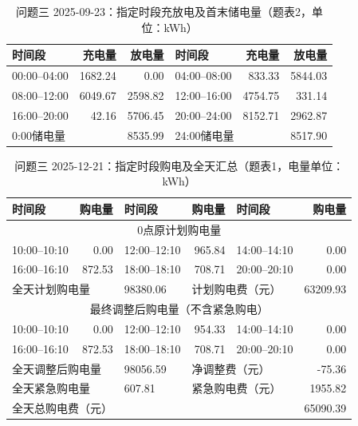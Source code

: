 \begin{table}[H]
\centering\footnotesize
\setlength{\tabcolsep}{4pt}
\caption{问题三 2025-09-23：指定时段充放电及首末储电量（题表2，单位：kWh）}
\label{tab:required-q3-2025-09-23-storage}
\begin{tabular}{@{}lrrlrr@{}}
\toprule
时间段 & 充电量 & 放电量 & 时间段 & 充电量 & 放电量 \\
\midrule
00:00--04:00 & 1682.24 & 0.00 & 04:00--08:00 & 833.33 & 5844.03 \\
08:00--12:00 & 6049.67 & 2598.82 & 12:00--16:00 & 4754.75 & 331.14 \\
16:00--20:00 & 42.16 & 5706.45 & 20:00--24:00 & 8152.71 & 2962.87 \\
\multicolumn{2}{l}{0:00储电量} & 8535.99 & \multicolumn{2}{l}{24:00储电量} & 8517.90 \\
\bottomrule
\end{tabular}
\end{table}

\FloatBarrier
\begin{table}[H]
\centering\footnotesize
\setlength{\tabcolsep}{4pt}
\caption{问题三 2025-12-21：指定时段购电及全天汇总（题表1，电量单位：kWh）}
\label{tab:required-q3-2025-12-21-grid}
\begin{tabular}{@{}lrlrlr@{}}
\toprule
时间段 & 购电量 & 时间段 & 购电量 & 时间段 & 购电量 \\
\midrule
\multicolumn{6}{c}{0点原计划购电量} \\
10:00--10:10 & 0.00 & 12:00--12:10 & 965.84 & 14:00--14:10 & 0.00 \\
16:00--16:10 & 872.53 & 18:00--18:10 & 708.71 & 20:00--20:10 & 0.00 \\
\multicolumn{2}{l}{全天计划购电量} & 98380.06 & \multicolumn{2}{l}{计划购电费（元）} & 63209.93 \\
\multicolumn{6}{c}{最终调整后购电量（不含紧急购电）} \\
10:00--10:10 & 0.00 & 12:00--12:10 & 954.33 & 14:00--14:10 & 0.00 \\
16:00--16:10 & 872.53 & 18:00--18:10 & 708.71 & 20:00--20:10 & 0.00 \\
\multicolumn{2}{l}{全天调整后购电量} & 98056.59 & \multicolumn{2}{l}{净调整费（元）} & -75.36 \\
\multicolumn{2}{l}{全天紧急购电量} & 607.81 & \multicolumn{2}{l}{紧急购电费（元）} & 1955.82 \\
\multicolumn{5}{l}{全天总购电费（元）} & 65090.39 \\
\bottomrule
\end{tabular}
\end{table}

